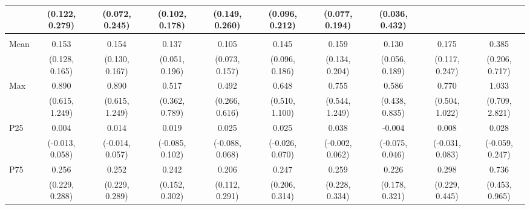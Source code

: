 {\begin{tabular}{l|c|c|c|c|c|c|c|c|c}
& {\scriptsize (0.122, 0.279)}
& {\scriptsize (0.072, 0.245)}
& {\scriptsize (0.102, 0.178)}
& {\scriptsize (0.149, 0.260)}
& {\scriptsize (0.096, 0.212)}
& {\scriptsize (0.077, 0.194)}
& {\scriptsize (0.036, 0.432)}
\\ [0.1cm]
\hline
\noalign{\smallskip}
\multicolumn{10}{l}{\textbf{Effect with Leads and Lags}} \\
\noalign{\smallskip}
\hline
Mean
& 0.153 & 0.154 & 0.137 & 0.105 & 0.145 & 0.159 & 0.130 & 0.175 & 0.385 \\
& {\scriptsize (0.128, 0.165)}
& {\scriptsize (0.130, 0.167)}
& {\scriptsize (0.051, 0.196)}
& {\scriptsize (0.073, 0.157)}
& {\scriptsize (0.096, 0.186)}
& {\scriptsize (0.134, 0.204)}
& {\scriptsize (0.056, 0.189)}
& {\scriptsize (0.117, 0.247)}
& {\scriptsize (0.206, 0.717)}
\\ [0.1cm]
\hline
Max
& 0.890 & 0.890 & 0.517 & 0.492 & 0.648 & 0.755 & 0.586 & 0.770 & 1.033 \\
& {\scriptsize (0.615, 1.249)}
& {\scriptsize (0.615, 1.249)}
& {\scriptsize (0.362, 0.789)}
& {\scriptsize (0.266, 0.616)}
& {\scriptsize (0.510, 1.100)}
& {\scriptsize (0.544, 1.249)}
& {\scriptsize (0.438, 0.835)}
& {\scriptsize (0.504, 1.022)}
& {\scriptsize (0.709, 2.821)}
\\ [0.1cm]
\hline
P25
& 0.004 & 0.014 & 0.019 & 0.025 & 0.025 & 0.038 & -0.004 & 0.008 & 0.028 \\
& {\scriptsize (-0.013, 0.058)}
& {\scriptsize (-0.014, 0.057)}
& {\scriptsize (-0.085, 0.102)}
& {\scriptsize (-0.088, 0.068)}
& {\scriptsize (-0.026, 0.070)}
& {\scriptsize (-0.002, 0.062)}
& {\scriptsize (-0.075, 0.046)}
& {\scriptsize (-0.031, 0.083)}
& {\scriptsize (-0.059, 0.247)}
\\ [0.1cm]
\hline
P75
& 0.256 & 0.252 & 0.242 & 0.206 & 0.247 & 0.259 & 0.226 & 0.298 & 0.736 \\
& {\scriptsize (0.229, 0.288)}
& {\scriptsize (0.229, 0.289)}
& {\scriptsize (0.152, 0.302)}
& {\scriptsize (0.112, 0.291)}
& {\scriptsize (0.206, 0.314)}
& {\scriptsize (0.228, 0.334)}
& {\scriptsize (0.178, 0.321)}
& {\scriptsize (0.229, 0.445)}
& {\scriptsize (0.453, 0.965)}
\\ [0.1cm]
\hline
\hline
\end{tabular}
}
